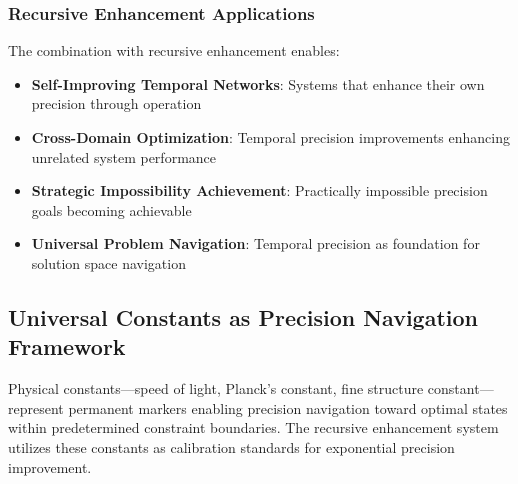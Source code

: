 \documentclass[12pt,a4paper]{article}
\begin{document}
{\subsubsection{Recursive Enhancement Applications}

The combination with recursive enhancement enables:

\begin{itemize}
\item \textbf{Self-Improving Temporal Networks}: Systems that enhance their own precision through operation
\item \textbf{Cross-Domain Optimization}: Temporal precision improvements enhancing unrelated system performance
\item \textbf{Strategic Impossibility Achievement}: Practically impossible precision goals becoming achievable
\item \textbf{Universal Problem Navigation}: Temporal precision as foundation for solution space navigation
\end{itemize}

\subsection{Universal Constants as Precision Navigation Framework}

Physical constants—speed of light, Planck's constant, fine structure constant—represent permanent markers enabling precision navigation toward optimal states within predetermined constraint boundaries. The recursive enhancement system utilizes these constants as calibration standards for exponential precision improvement.

\begin{figure}[h]
\centering
{}
\end{figure}}
\end{document}
